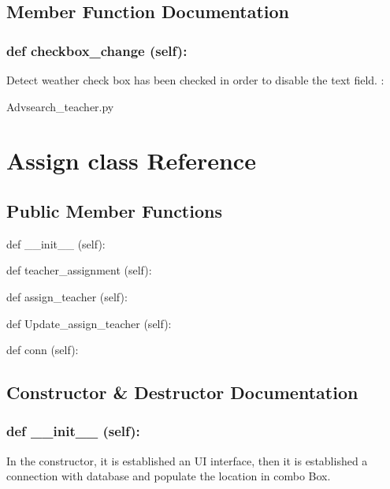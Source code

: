 \subsection{Member Function Documentation}
\hypertarget{class_poly_a14a7ad77ce612b0c54f531d307ee4b39}{
\subsubsection[{def checkbox_change (self):}]{\setlength{\rightskip}{0pt plus 5cm}def {checkbox\_change} (self):}}\label{class_poly_a14a7ad77ce612b0c54f531d307ee4b39}
Detect weather check box has been checked in order to disable the text field.
:\begin{DoxyCompactItemize}
\item 
Advsearch\_teacher.\-py\end{DoxyCompactItemize}


\hypertarget{Assign_class}{\section{Assign class Reference}
\label{Assign_class}
}
\subsection*{Public Member Functions}
\begin{DoxyCompactItemize}
\item 
def {\_\_init\_\_} (self):
\item 
def {teacher\_assignment} (self):
\item 
def {assign\_teacher} (self):
\item 
def {Update\_assign\_teacher} (self):
\item 
def {conn} (self):
\end{DoxyCompactItemize}

\subsection{Constructor \& Destructor Documentation}
\hypertarget{class_poly_aa3def076b74bed67904976ad4f9fe9b1}{
\subsubsection[{def __init__ (self):}]{\setlength{\rightskip}{0pt plus 5cm}def {\_\_init\_\_} (self): 
}}
In the constructor, it is established an UI interface, then it is  established a connection with database and populate the location in combo Box.
 

